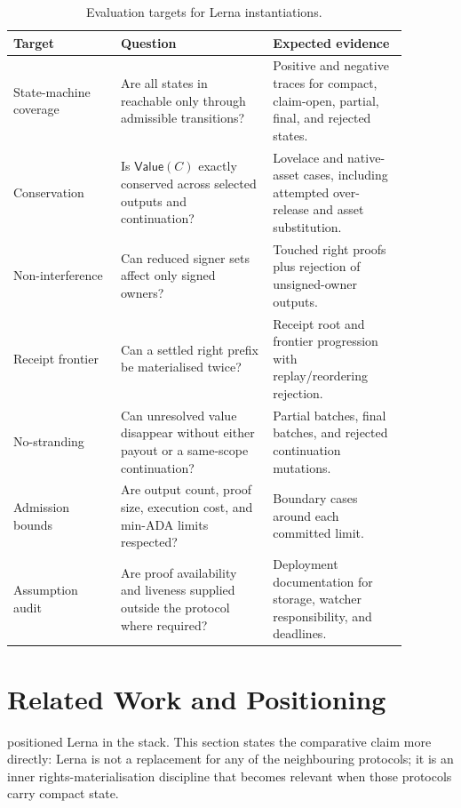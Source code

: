 \documentclass[a4paper,11pt]{article}
\theoremstyle{definition}
\theoremstyle{plain}
\theoremstyle{remark}
\newcommand{\Value}{\mathsf{Value}}
\begin{document}
\begin{table}[t]
\centering
\caption{Evaluation targets for Lerna instantiations.}
\label{tab:evaluation-targets}
\begin{tabular}{L{0.24\linewidth}L{0.34\linewidth}L{0.30\linewidth}}
\toprule
\textbf{Target} & \textbf{Question} & \textbf{Expected evidence}\\
\midrule
State-machine coverage & Are all states in  reachable
only through admissible transitions? & Positive and negative traces for compact,
claim-open, partial, final, and rejected states.\\
Conservation & Is \(\Value(C)\) exactly conserved across selected outputs and
continuation? & Lovelace and native-asset cases, including attempted
over-release and asset substitution.\\
Non-interference & Can reduced signer sets affect only signed owners? & Touched
right proofs plus rejection of unsigned-owner outputs.\\
Receipt frontier & Can a settled right prefix be materialised twice? & Receipt
root and frontier progression with replay/reordering rejection.\\
No-stranding & Can unresolved value disappear without either payout or a
same-scope continuation? & Partial batches, final batches, and rejected
continuation mutations.\\
Admission bounds & Are output count, proof size, execution cost, and min-ADA
limits respected? & Boundary cases around each committed limit.\\
Assumption audit & Are proof availability and liveness supplied outside the
protocol where required? & Deployment documentation for storage, watcher
responsibility, and deadlines.\\
\bottomrule
\end{tabular}
\end{table}

\section{Related Work and Positioning}
\label{sec:related-work}

 positioned Lerna in the stack. This section states the
comparative claim more directly: Lerna is not a replacement for any of the
neighbouring protocols; it is an inner rights-materialisation discipline that
becomes relevant when those protocols carry compact state.
\end{document}
